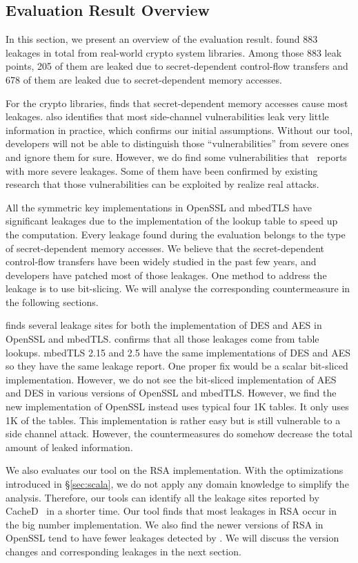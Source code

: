 \subsection{Evaluation Result Overview} \label{sec:eval_overview}
In this section, we present an overview of the evaluation result. \tool{} found
883 leakages in total from real-world crypto system libraries. Among those 883
leak points, 205 of them are leaked due to secret-dependent control-flow
transfers and 678 of them are leaked due to secret-dependent memory accesses.

For the crypto libraries, \tool{} finds that secret-dependent memory accesses
cause most leakages. \tool{} also identifies that most side-channel
vulnerabilities leak very little information in practice, which confirms our
initial assumptions.  Without our tool, developers will not be able to
distinguish those ``vulnerabilities'' from severe ones and ignore them for sure.
However, we do find some vulnerabilities that \tool\ reports with more severe
leakages. Some of them have been confirmed by existing research that those
vulnerabilities can be exploited by realize real attacks.

All the symmetric key implementations in OpenSSL and mbedTLS have significant
leakages due to the implementation of the lookup table to speed up the
computation. Every leakage found during the evaluation belongs to the type of
secret-dependent memory accesses. We believe that the secret-dependent
control-flow transfers have been widely studied in the past few years, and
developers have patched most of those leakages. One method to address the
leakage is to use bit-slicing. We will analyse the corresponding countermeasure
in the following sections.

\tool{} finds several leakage sites for both the implementation of DES and AES in
OpenSSL and mbedTLS\@. \tool{} confirms that all those leakages come from table
lookups. mbedTLS 2.15 and 2.5 have the same implementations of DES and AES so
they have the same leakage report. One proper fix would be a scalar bit-sliced
implementation. However, we do not see the bit-sliced implementation of AES and
DES in various versions of OpenSSL and mbedTLS\@. However, we find the new
implementation of OpenSSL instead uses typical four 1K tables. It only uses 1K
of the tables. This implementation is rather easy but is still vulnerable to a
side channel attack. However, the countermeasures do somehow decrease the total
amount of leaked information.

We also evaluates our tool on the RSA implementation. With the optimizations
introduced in \S\ref{sec:scala}, we do not apply any domain knowledge to
simplify the analysis. Therefore, our tools can identify all the leakage sites
reported by CacheD~\cite{203878} in a shorter time. Our tool finds that most
leakages in RSA occur in the big number implementation. We also find the newer
versions of RSA in OpenSSL tend to have fewer leakages detected by \tool{}. We
will discuss the version changes and corresponding leakages in the next section.

